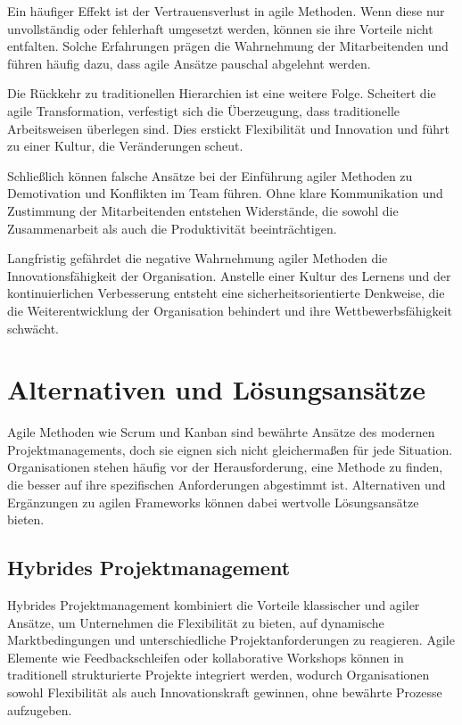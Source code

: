 \documentclass[ngerman]{seminarvorlage}
\begin{document}
Ein häufiger Effekt ist der Vertrauensverlust in agile Methoden. Wenn diese nur unvollständig oder fehlerhaft umgesetzt werden, können sie ihre Vorteile nicht entfalten. Solche Erfahrungen prägen die Wahrnehmung der Mitarbeitenden und führen häufig dazu, dass agile Ansätze pauschal abgelehnt werden.

Die Rückkehr zu traditionellen Hierarchien ist eine weitere Folge. Scheitert die agile Transformation, verfestigt sich die Überzeugung, dass traditionelle Arbeitsweisen überlegen sind. Dies erstickt Flexibilität und Innovation und führt zu einer Kultur, die Veränderungen scheut.

Schließlich können falsche Ansätze bei der Einführung agiler Methoden zu Demotivation und Konflikten im Team führen. Ohne klare Kommunikation und Zustimmung der Mitarbeitenden entstehen Widerstände, die sowohl die Zusammenarbeit als auch die Produktivität beeinträchtigen.

Langfristig gefährdet die negative Wahrnehmung agiler Methoden die Innovationsfähigkeit der Organisation. Anstelle einer Kultur des Lernens und der kontinuierlichen Verbesserung entsteht eine sicherheitsorientierte Denkweise, die die Weiterentwicklung der Organisation behindert und ihre Wettbewerbsfähigkeit schwächt.
\cite{stawicki_10_2021}

\section{Alternativen und Lösungsansätze}
Agile Methoden wie Scrum und Kanban sind bewährte Ansätze des modernen Projektmanagements, doch sie eignen sich nicht gleicherma\ss{}en für jede Situation. Organisationen stehen häufig vor der Herausforderung, eine Methode zu finden, die besser auf ihre spezifischen Anforderungen abgestimmt ist. Alternativen und Ergänzungen zu agilen Frameworks können dabei wertvolle Lösungsansätze bieten.

\subsection{Hybrides Projektmanagement}
Hybrides Projektmanagement kombiniert die Vorteile klassischer und agiler Ansätze, um Unternehmen die Flexibilität zu bieten, auf dynamische Marktbedingungen und unterschiedliche Projektanforderungen zu reagieren. Agile Elemente wie Feedbackschleifen oder kollaborative Workshops können in traditionell strukturierte Projekte integriert werden, wodurch Organisationen sowohl Flexibilität als auch Innovationskraft gewinnen, ohne bewährte Prozesse aufzugeben.
\end{document}

